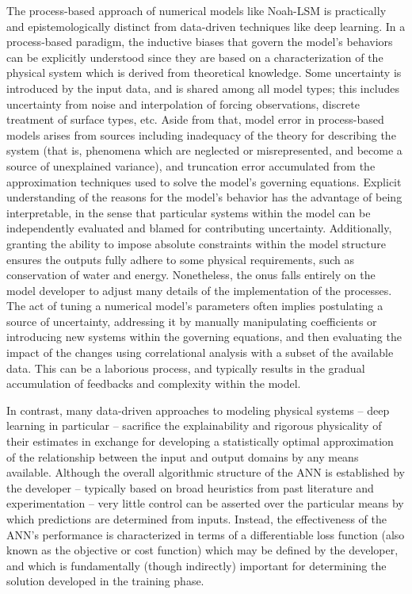 The process-based approach of numerical models like Noah-LSM is practically and epistemologically distinct from data-driven techniques like deep learning. In a process-based paradigm, the inductive biases that govern the model's behaviors can be explicitly understood since they are based on a characterization of the physical system which is derived from theoretical knowledge. Some uncertainty is introduced by the input data, and is shared among all model types; this includes uncertainty from noise and interpolation of forcing observations, discrete treatment of surface types, etc. Aside from that, model error in process-based models arises from sources including inadequacy of the theory for describing the system (that is, phenomena which are neglected or misrepresented, and become a source of unexplained variance), and truncation error accumulated from the approximation techniques used to solve the model's governing equations. Explicit understanding of the reasons for the model's behavior has the advantage of being interpretable, in the sense that particular systems within the model can be independently evaluated and blamed for contributing uncertainty. Additionally, granting the ability to impose absolute constraints within the model structure ensures the outputs fully adhere to some physical requirements, such as conservation of water and energy. Nonetheless, the onus falls entirely on the model developer to adjust many details of the implementation of the processes. The act of tuning a numerical model's parameters often implies postulating a source of uncertainty, addressing it by manually manipulating coefficients or introducing new systems within the governing equations, and then evaluating the impact of the changes using correlational analysis with a subset of the available data. This can be a laborious process, and typically results in the gradual accumulation of feedbacks and complexity within the model.

In contrast, many data-driven approaches to modeling physical systems -- deep learning in particular -- sacrifice the explainability and rigorous physicality of their estimates in exchange for developing a statistically optimal approximation of the relationship between the input and output domains by any means available. Although the overall algorithmic structure of the ANN is established by the developer -- typically based on broad heuristics from past literature and experimentation -- very little control can be asserted over the particular means by which predictions are determined from inputs. Instead, the effectiveness of the ANN's performance is characterized in terms of a differentiable loss function (also known as the objective or cost function) which may be defined by the developer, and which is fundamentally (though indirectly) important for determining the solution developed in the training phase.

